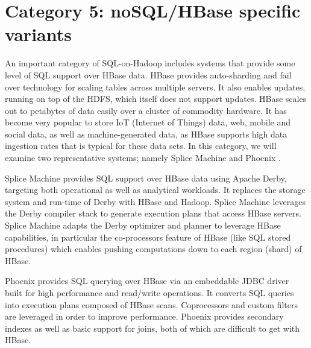 \documentclass{vldb}
\begin{document}
\section{Category 5: noSQL/HBase specific variants}

An important category of SQL-on-Hadoop includes systems that provide some level of SQL support over HBase data. HBase provides auto-sharding and fail over technology for scaling tables across multiple servers. It also enables updates, running on top of the HDFS, which itself does not support updates. HBase scales out to petabytes of data easily over a cluster of commodity hardware. It has become very popular to store IoT (Internet of Things) data, web, mobile and social data, as well as machine-generated data, as HBase supports high data ingestion rates that is typical for these data sets. In this category, we will examine two representative systems; namely Splice Machine \cite{splice} and Phoenix \cite{phoenix}. 

Splice Machine \cite{splice} provides SQL support over HBase data using Apache Derby, targeting both operational as well as analytical workloads. It replaces the storage system and run-time of Derby with HBase and Hadoop. Splice Machine leverages the Derby compiler stack to generate execution plans that access HBase servers. Splice Machine adapts the Derby optimizer and planner to leverage HBase capabilities, in particular the co-processors feature of HBase 
(like SQL stored procedures) which enables pushing computations 
down to each region (shard) of HBase.

Phoenix provides SQL querying over HBase via an embeddable JDBC 
driver built for high performance and read/write operations. It 
converts SQL queries into execution plans composed of 
HBase scans. Coprocessors and custom filters are  leveraged
in order to improve performance.  Phoenix provides secondary indexes as
 well as basic support for joins, both of which are difficult to 
get with HBase. 




\balance
\end{document}
